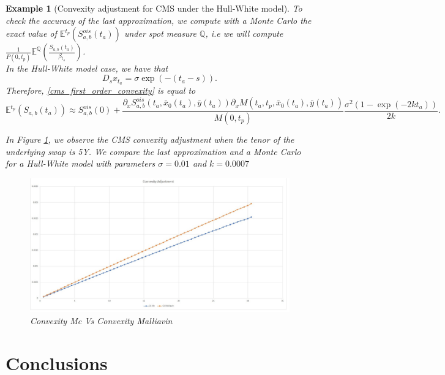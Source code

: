 \documentclass[a4paper,10pt]{article}
\newtheorem{example}[theorem]{Example}
\newcommand{\1}{\mathbf{1}}
\begin{document}
\begin{example}[Convexity adjustment for CMS under the Hull-White model]
To check the accuracy of the last approximation, we compute with a Monte Carlo the exact value of $\mathbb{E}^{t_p}\left(S^{ois}_{a,b}(t_a)\right)$ under spot measure $\mathbb{Q}$, i.e we will compute  $\frac{1}{P(0,t_p)}  \mathbb{E}^{\mathbb{Q}}\left(\frac{S_{a,b}(t_a)}{\beta_{t_a}} \right)$.\\
In the Hull-White model case, we have that
\begin{equation*}
D_s x_{t_a} = \sigma \exp(-(t_a - s)).
\end{equation*}
Therefore, \eqref{cms_first_order_convexity} is equal to
\begin{equation*}
\mathbb{E}^{t_p}\left(S_{a,b}(t_a)\right) \approx  S^{ois}_{a,b}(0) + \frac{\partial_x S^{ois}_{a,b}(t_a, \bar{x}_0(t_a),\bar{y}(t_a))\partial_x M(t_a,t_p, \bar{x}_0(t_a),\bar{y}(t_a))}{M(0,t_p)} \frac{\sigma^{2}(1-\exp(-2kt_a))}{2k}.
\end{equation*}

In Figure \ref{fig:CMS}, we observe the CMS convexity adjustment when the tenor of the underlying swap is 5Y. We compare the last approximation and a Monte Carlo for a Hull-White model with parameters $\sigma=0.01$ and $k=0.0007$

\begin{figure}[h]
	\begin{center}
		\includegraphics[scale=0.25]{Figures/cms_convexity_order.jpg}
	\end{center}
	\caption{Convexity Mc Vs Convexity Malliavin}
	\label{fig:CMS}
\end{figure} 
\end{example}


\section{Conclusions}\label{sec:Conclusion}
\end{document}
